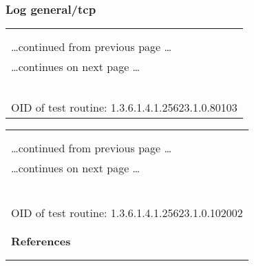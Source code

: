 \documentclass{article}
\begin{document}
\subsubsection{Log general/tcp}
\label{port:192.168.248.131 general/tcp Log}

\begin{longtable}{|p{}|}
\hline
\rowcolor{openvas_log}{\color{white}{Log (CVSS: 7.8) }}\\
\rowcolor{openvas_log}{\color{white}{NVT: 3com switch2hub}}\\
\hline
\endfirsthead
\hfill\ldots continued from previous page \ldots \\
\hline
\endhead
\hline
\ldots continues on next page \ldots \\
\endfoot
\hline
\endlastfoot
\\
\rowcolor{white}{\verb=Fake IP address not specified. Skipping this check. =}\\
\rowcolor{white}{\verb==}\\
\rowcolor{white}{\verb==}\\
\\
OID of test routine: 1.3.6.1.4.1.25623.1.0.80103\\
\end{longtable}

\begin{longtable}{|p{}|}
\hline
\rowcolor{openvas_log}{\color{white}{Log (CVSS: 0.0) }}\\
\rowcolor{openvas_log}{\color{white}{NVT: OS fingerprinting}}\\
\hline
\endfirsthead
\hfill\ldots continued from previous page \ldots \\
\hline
\endhead
\hline
\ldots continues on next page \ldots \\
\endfoot
\hline
\endlastfoot
\\
\rowcolor{white}{\verb=ICMP based OS fingerprint results: (83% confidence)=}\\
\rowcolor{white}{\verb=Microsoft Windows=}\\
\rowcolor{white}{\verb==}\\
\rowcolor{white}{\verb==}\\
\\
OID of test routine: 1.3.6.1.4.1.25623.1.0.102002\\
\\

      \hline
      \\
\textbf{References}\\
\rowcolor{white}{\verb=Other:=}\\
\rowcolor{white}{\verb=  URL:http://www.phrack.org/issues.html?issue=\verb-=-\verb=57&amp;id=\verb-=-\verb=7#article=}\\
\end{longtable}
\end{document}
